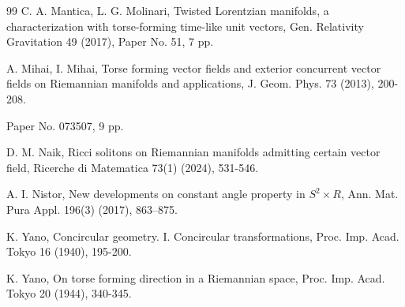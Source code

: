 \documentclass[12pt]{amsart}
\theoremstyle{definition}
\begin{document}
\begin{thebibliography}{99}
 C. A. Mantica, L. G. Molinari, Twisted Lorentzian manifolds, a characterization with torse-forming time-like unit vectors, Gen. Relativity Gravitation 49 (2017), Paper No. 51, 7 pp.

 A. Mihai, I. Mihai, Torse forming vector fields and exterior concurrent vector fields on Riemannian manifolds and applications, J. Geom. Phys. 73 (2013), 200-208.

Paper No. 073507, 9 pp.


 D. M. Naik, Ricci solitons on Riemannian manifolds admitting certain vector field, Ricerche di Matematica 73(1) (2024), 531-546.

 A. I. Nistor, New developments on constant angle property in $S^2\times R$, Ann. Mat. Pura Appl. 196(3) (2017), 863–875.




 K. Yano, Concircular geometry. I. Concircular transformations, Proc. Imp. Acad. Tokyo 16 (1940), 195-200.

 K. Yano, On torse forming direction in a Riemannian space, Proc. Imp. Acad. Tokyo 20 (1944), 340-345.


\end{thebibliography}




 
\end{document}
